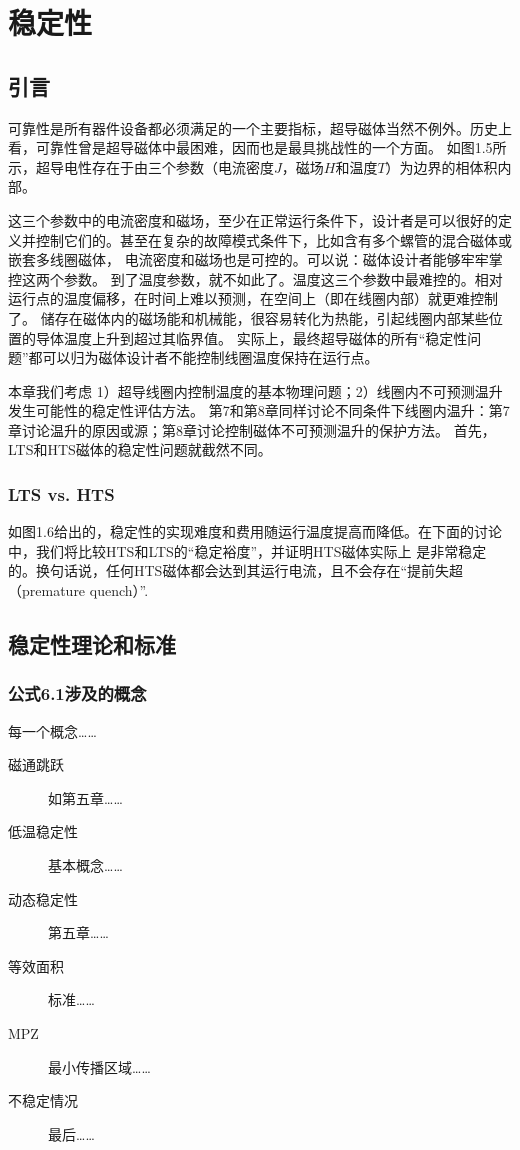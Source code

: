 \chapter{稳定性}
\section{引言}
可靠性是所有器件设备都必须满足的一个主要指标，超导磁体当然不例外。历史上看，可靠性曾是超导磁体中最困难，因而也是最具挑战性的一个方面。
如图1.5所示，超导电性存在于由三个参数（电流密度$J$，磁场$H$和温度$T$）为边界的相体积内部。

这三个参数中的电流密度和磁场，至少在正常运行条件下，设计者是可以很好的定义并控制它们的。甚至在复杂的故障模式条件下，比如含有多个螺管的混合磁体或嵌套多线圈磁体，
电流密度和磁场也是可控的。可以说：磁体设计者能够牢牢掌控这两个参数。
到了温度参数，就不如此了。温度这三个参数中最难控的。相对运行点的温度偏移，在时间上难以预测，在空间上（即在线圈内部）就更难控制了。
储存在磁体内的磁场能和机械能，很容易转化为热能，引起线圈内部某些位置的导体温度上升到超过其临界值。
实际上，最终超导磁体的所有“稳定性问题”都可以归为磁体设计者不能控制线圈温度保持在运行点。

本章我们考虑 1）超导线圈内控制温度的基本物理问题；2）线圈内不可预测温升发生可能性的稳定性评估方法。
第7和第8章同样讨论不同条件下线圈内温升：第7章讨论温升的原因或源；第8章讨论控制磁体不可预测温升的保护方法。
首先，LTS和HTS磁体的稳定性问题就截然不同。

\subsection*{LTS vs. HTS}
如图1.6给出的，稳定性的实现难度和费用随运行温度提高而降低。在下面的讨论中，我们将比较HTS和LTS的“稳定裕度”，并证明HTS磁体实际上
是非常稳定的。换句话说，任何HTS磁体都会达到其运行电流，且不会存在“提前失超（premature quench）”.

\section{稳定性理论和标准}

\subsection{公式6.1涉及的概念}
每一个概念……
\begin{description}
  \item[磁通跳跃] 如第五章……
  \item[低温稳定性] 基本概念……
  \item[动态稳定性] 第五章……
  \item[等效面积] 标准……
  \item[MPZ] 最小传播区域……
  \item[不稳定情况] 最后……
\end{description}

